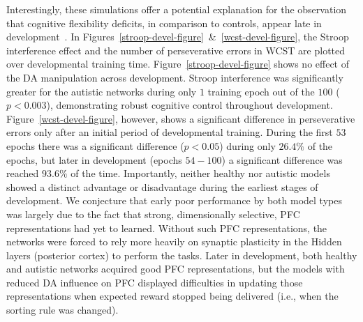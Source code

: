 


Interestingly, these simulations offer a potential explanation for the observation that cognitive flexibility deficits, in comparison to controls, appear late in development~\cite{GriffithEM:1999:AutismYoungED}. In Figures~\ref{stroop-devel-figure}~\&~\ref{wcst-devel-figure}, the Stroop interference effect and the number of perseverative errors in WCST are plotted over developmental training time. Figure~\ref{stroop-devel-figure} shows no effect of the DA manipulation across development. Stroop interference was significantly greater for the autistic networks during only $1$ training epoch out of the $100$ ($p < 0.003$), demonstrating robust cognitive control throughout development. Figure~\ref{wcst-devel-figure}, however, shows a significant difference in perseverative errors only after an initial period of developmental training. During the first $53$ epochs there was a significant difference ($p < 0.05$) during only $26.4\%$ of the epochs, but later in development (epochs $54-100$) a significant difference was reached $93.6\%$ of the time. Importantly, neither healthy nor autistic models showed a distinct advantage or disadvantage during the earliest stages of development. We conjecture that early poor performance by both model types was largely due to the fact that strong, dimensionally selective, PFC representations had yet to learned. Without such PFC representations, the networks were forced to rely more heavily on synaptic plasticity in the Hidden layers (posterior cortex) to perform the tasks. Later in development, both healthy and autistic networks acquired good PFC representations, but the models with reduced DA influence on PFC displayed difficulties in updating those representations when expected reward stopped being delivered (i.e., when the sorting rule was changed).

